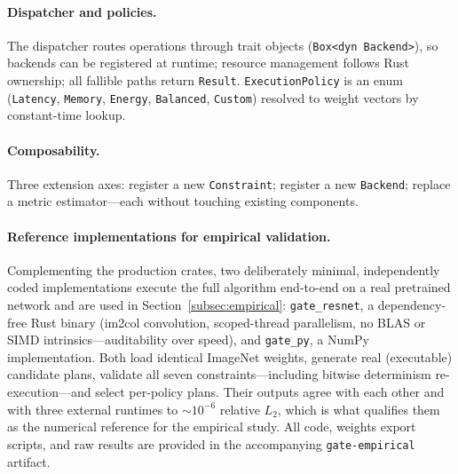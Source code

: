 \paragraph{Dispatcher and policies.}
The dispatcher routes operations through trait objects
(\texttt{Box<dyn Backend>}), so backends can be registered at runtime;
resource management follows Rust ownership; all fallible paths return
\texttt{Result}. \texttt{ExecutionPolicy} is an enum
(\texttt{Latency}, \texttt{Memory}, \texttt{Energy},
\texttt{Balanced}, \texttt{Custom}) resolved to weight vectors by
constant-time lookup.

\paragraph{Composability.}
Three extension axes: register a new \texttt{Constraint}; register a
new \texttt{Backend}; replace a metric estimator---each without
touching existing components.

\paragraph{Reference implementations for empirical validation.}
Complementing the production crates, two deliberately minimal,
independently coded implementations execute the full
algorithm end-to-end on a real pretrained network and are used in
Section~\ref{subsec:empirical}: \texttt{gate\_resnet}, a
dependency-free Rust binary (im2col convolution, scoped-thread
parallelism, no BLAS or SIMD intrinsics---auditability over speed),
and \texttt{gate\_py}, a NumPy implementation. Both load identical
ImageNet weights, generate real (executable) candidate plans, validate
all seven constraints---including bitwise determinism re-execution---and
select per-policy plans. Their outputs agree with each other and with
three external runtimes to ${\sim}10^{-6}$ relative $L_2$, which is
what qualifies them as the numerical reference for the empirical study.
All code, weights export scripts, and raw results are provided in the
accompanying \texttt{gate-empirical} artifact.

